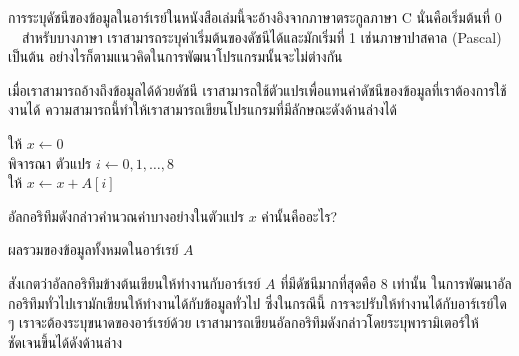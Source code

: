 การ{\wbr}ระบุ{\wbr}ดัชนี{\wbr}ของ{\wbr}ข้อมูล{\wbr}ใน{\wbr}อาร์เรย์{\wbr}ใน{\wbr}หนังสือ{\wbr}เล่ม{\wbr}นี้{\wbr}จะ{\wbr}อ้างอิง{\wbr}จาก{\wbr}ภาษา{\wbr}ตระกูล{\wbr}ภาษา C
นั่น{\wbr}คือ{\wbr}เริ่มต้น{\wbr}ที่ 0 \ \ สำหรับ{\wbr}บาง{\wbr}ภาษา เรา{\wbr}สามารถ{\wbr}ระบุ{\wbr}ค่า{\wbr}เริ่มต้น{\wbr}ของ{\wbr}ดัชนี{\wbr}ได้{\wbr}และ{\wbr}มัก{\wbr}เริ่ม{\wbr}ที่ 1
เช่น{\wbr}ภาษา{\wbr}ปา{\wbr}ส{\wbr}คา{\wbr}ล (Pascal) เป็นต้น{\wbr}
อย่างไรก็ตาม{\wbr}แนว{\wbr}คิด{\wbr}ใน{\wbr}การ{\wbr}พัฒนา{\wbr}โปรแกรม{\wbr}นั้น{\wbr}จะ{\wbr}ไม่{\wbr}ต่าง{\wbr}กัน{\wbr}

เมื่อ{\wbr}เรา{\wbr}สามารถ{\wbr}อ้าง{\wbr}ถึง{\wbr}ข้อมูล{\wbr}ได้{\wbr}ด้วย{\wbr}ดัชนี{\wbr}
เรา{\wbr}สามารถ{\wbr}ใช้{\wbr}ตัวแปร{\wbr}เพื่อ{\wbr}แทน{\wbr}ค่า{\wbr}ดัชนี{\wbr}ของ{\wbr}ข้อมูล{\wbr}ที่{\wbr}เรา{\wbr}ต้องการ{\wbr}ใช้{\wbr}งาน{\wbr}ได้{\wbr}
ความ{\wbr}สามารถ{\wbr}นี้{\wbr}ทำ{\wbr}ให้{\wbr}เรา{\wbr}สามารถ{\wbr}เขียน{\wbr}โปรแกรม{\wbr}ที่{\wbr}มี{\wbr}ลักษณะ{\wbr}ดัง{\wbr}ด้าน{\wbr}ล่าง{\wbr}ได้{\wbr}

\begin{algt}
\noindent \hspace*{0.2in} ให้ $x\leftarrow 0$\\
\hspace*{0.2in} พิจารณา ตัวแปร $i\leftarrow 0,1,\ldots,8$\\
\hspace*{0.2in}\hspace*{0.2in} ให้ $x \leftarrow x + A[i]$
\end{algt}

\begin{quiz}{}
อัล{\wbr}กอ{\wbr}ริ{\wbr}ทึม{\wbr}ดังกล่าว{\wbr}คำนวณ{\wbr}ค่า{\wbr}บาง{\wbr}อย่าง{\wbr}ใน{\wbr}ตัวแปร $x$ ค่า{\wbr}นั้น{\wbr}คือ{\wbr}อะไร?
\end{quiz}
\begin{quizans}
ผลรวม{\wbr}ของ{\wbr}ข้อมูล{\wbr}ทั้งหมด{\wbr}ใน{\wbr}อาร์เรย์ $A$
\end{quizans}

สังเกต{\wbr}ว่า{\wbr}อัล{\wbr}กอ{\wbr}ริ{\wbr}ทึม{\wbr}ข้างต้น{\wbr}เขียน{\wbr}ให้{\wbr}ทำงาน{\wbr}กับ{\wbr}อาร์เรย์ $A$ ที่{\wbr}มี{\wbr}ดัชนี{\wbr}มาก{\wbr}ที่สุด{\wbr}คือ 8 เท่านั้น{\wbr}
ใน{\wbr}การ{\wbr}พัฒนา{\wbr}อัล{\wbr}กอ{\wbr}ริ{\wbr}ทึม{\wbr}ทั่วไป{\wbr}เรา{\wbr}มัก{\wbr}เขียน{\wbr}ให้{\wbr}ทำงาน{\wbr}ได้{\wbr}กับ{\wbr}ข้อมูล{\wbr}ทั่วไป ซึ่ง{\wbr}ใน{\wbr}กรณี{\wbr}นี้{\wbr}
การ{\wbr}จะ{\wbr}ปรับ{\wbr}ให้{\wbr}ทำงาน{\wbr}ได้{\wbr}กับ{\wbr}อาร์เรย์{\wbr}ใด ๆ เรา{\wbr}จะ{\wbr}ต้อง{\wbr}ระบุ{\wbr}ขนาด{\wbr}ของ{\wbr}อาร์เรย์{\wbr}ด้วย{\wbr}
เรา{\wbr}สามารถ{\wbr}เขียน{\wbr}อัล{\wbr}กอ{\wbr}ริ{\wbr}ทึม{\wbr}ดังกล่าว{\wbr}โดย{\wbr}ระบุ{\wbr}พารามิเตอร์{\wbr}ให้{\wbr}ชัดเจน{\wbr}ขึ้น{\wbr}ได้{\wbr}ดัง{\wbr}ด้าน{\wbr}ล่าง{\wbr}

